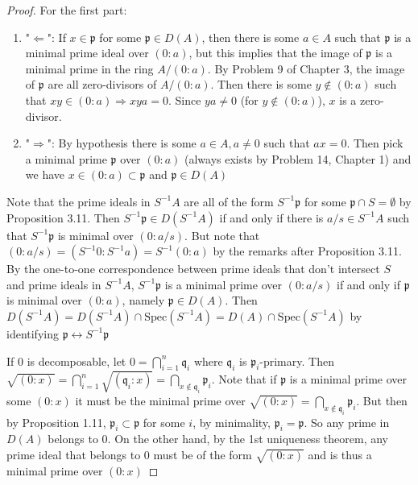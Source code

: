 \documentclass{solution}
\begin{document}
\begin{proof}
    For the first part:
    \begin{enumerate}
        \item "$\Leftarrow$": If $x \in \mathfrak{p}$ for some $\mathfrak{p} \in D(A)$, then there is some $a \in A$ such that $\mathfrak{p}$ is a minimal prime ideal over $(0: a)$, but this implies that the image of $\mathfrak{p}$ is a minimal prime in the ring $A / (0 : a)$. By Problem 9 of Chapter 3, the image of $\mathfrak{p}$ are all zero-divisors of $A / (0 : a)$. Then there is some $y \notin (0 : a)$ such that $xy \in (0 : a) \Rightarrow xya = 0$. Since $ya \ne 0$ (for $y \notin (0 : a)$), $x$ is a zero-divisor.
        \item "$\Rightarrow$": By hypothesis there is some $a \in A, a \ne 0$ such that $ax = 0$. Then pick a minimal prime $\mathfrak{p}$ over $(0 : a)$ (always exists by Problem 14, Chapter 1) and we have $x \in (0 : a) \subset \mathfrak{p}$ and $\mathfrak{p} \in D(A)$
    \end{enumerate}
    Note that the prime ideals in $S ^{-1} A$ are all of the form $S ^{-1} \mathfrak{p}$ for some $\mathfrak{p} \cap S = \emptyset$ by Proposition 3.11. Then $S ^{-1} \mathfrak{p} \in D(S ^{-1} A)$ if and only if there is $a / s \in S ^{-1} A$ such that $S ^{-1} \mathfrak{p}$ is minimal over $(0 : a / s)$. But note that $(0: a / s) = (S ^{-1} 0 : S ^{-1} a) = S ^{-1}(0 : a)$ by the remarks after Proposition 3.11. By the one-to-one correspondence between prime ideals that don't intersect $S$ and prime ideals in $S ^{-1} A$, $S ^{-1} \mathfrak{p}$ is a minimal prime over $(0 : a / s)$ if and only if $\mathfrak{p}$ is minimal over $(0: a)$, namely $\mathfrak{p} \in D(A)$. Then $D(S ^{-1} A) = D(S ^{-1} A) \cap \mathrm{Spec}(S ^{-1} A) = D(A) \cap \mathrm{Spec}(S ^{-1} A)$ by identifying $\mathfrak{p} \leftrightarrow S ^{-1} \mathfrak{p}$

    If $0$ is decomposable, let $0 = \bigcap\limits_{i = 1}^{n} \mathfrak{q}_i$ where $\mathfrak{q}_i$ is $\mathfrak{p}_i$-primary. Then $\sqrt{(0 : x)} = \bigcap\limits_{i = 1}^{n} \sqrt{(\mathfrak{q}_i : x)} = \bigcap\limits_{x \notin \mathfrak{q}_i} \mathfrak{p}_i$. Note that if $\mathfrak{p}$ is a minimal prime over some $(0 : x)$ it must be the minimal prime over $\sqrt{(0 : x)} = \bigcap\limits_{x \notin \mathfrak{q}_i} \mathfrak{p}_i$. But then by Proposition 1.11, $\mathfrak{p}_i \subset \mathfrak{p}$ for some $i$, by minimality, $\mathfrak{p}_i = \mathfrak{p}$. So any prime in $D(A)$ belongs to $0$. On the other hand, by the 1st uniqueness theorem, any prime ideal that belongs to $0$ must be of the form $\sqrt{(0 : x)}$ and is thus a minimal prime over $(0: x)$
\end{proof}
\end{document}
